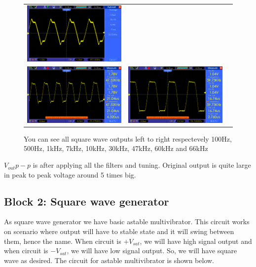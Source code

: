\documentclass[14pt,a4paper]{extarticle}
\begin{document}
\begin{figure}[H]
\begin{tabular}{ccc}
    \includegraphics[width=.49\linewidth]{imgs/square30k.png}\\
    \includegraphics[width=.49\linewidth]{imgs/square47k.png}&
    \includegraphics[width=.49\linewidth]{imgs/square60k.png}
\end{tabular}
\vspace{0.2cm}
\caption{You can see all square wave outputs left to right respectevely 100Hz, 500Hz, 1kHz, 7kHz, 10kHz, 30kHz, 47kHz, 60kHz and 66kHz}
\label{fig:filters}
\end{figure}

\(V_{out}{p-p}\) is after applying all the filters and tuning. Original output is quite large in peak to peak voltage around 5 times big.




\subsection{Block 2: Square wave generator}
\label{sec:org9e374f9}

As square wave generator we have basic astable multivibrator. This circuit works on scenario where output will have to stable state and it will swing between them, hence the name. When circuit is \(+V_{sat}\), we will have high signal output and when circuit is \(-V_{sat}\), we will have low signal output. So, we will have square wave as desired. The circuit for astable multivibrator is shown below.
\end{document}
